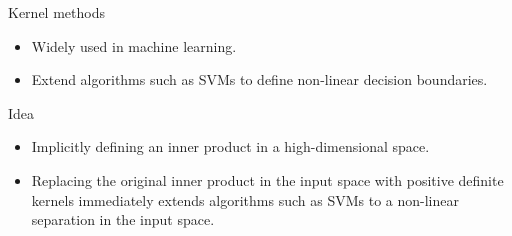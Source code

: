 \documentclass[xcolor={usenames,dvipsnames}]{beamer}
\begin{document}
\begin{frame}{Kernel methods}
\begin{itemize}
\item Widely used in machine learning. 
\item Extend algorithms such as SVMs to define non-linear decision boundaries. 
\end{itemize}

\begin{block}{Idea}
\begin{itemize}
\item Implicitly defining an inner product in a high-dimensional space.

\vspace{.2cm}

\item Replacing the original inner product in the input space with positive definite kernels immediately extends algorithms such as SVMs  to a \alert{non-linear separation in the input space}.
\end{itemize}
\end{block}
\end{frame}

%

%


%
\end{document}
